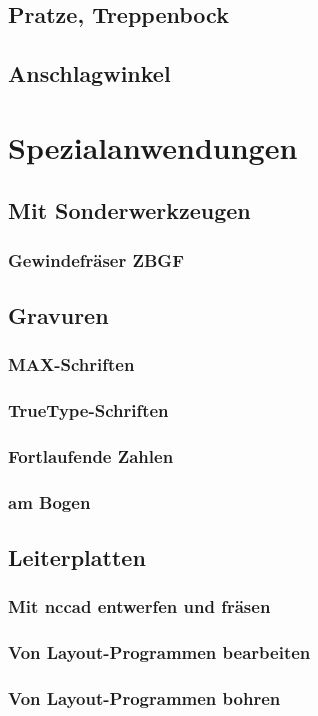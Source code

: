 \documentclass[14pt,a4paper]{book}
\begin{document}
		\subsection{Pratze, Treppenbock} 
		\subsection{Anschlagwinkel} 		 
	\section{Spezialanwendungen} 
		\subsection{Mit Sonderwerkzeugen}
			\subsubsection{Gewindefräser ZBGF} 
		\subsection{Gravuren} 
			\subsubsection{MAX-Schriften} 
			\subsubsection{TrueType-Schriften} 
			\subsubsection{Fortlaufende Zahlen}
			\subsubsection{am Bogen}
		\subsection{Leiterplatten} 
			\subsubsection{Mit nccad entwerfen und fräsen} 
			\subsubsection{Von Layout-Programmen bearbeiten} 
			\subsubsection{Von Layout-Programmen bohren} 
\end{document}
